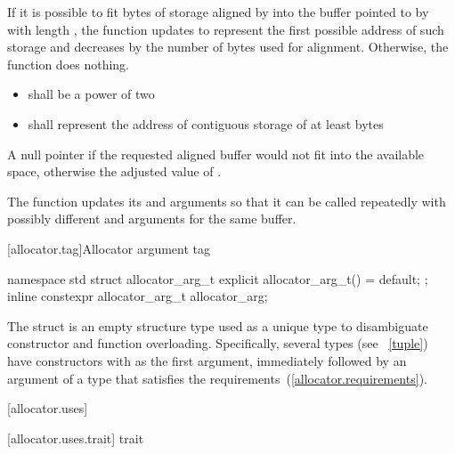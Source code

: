 \begin{itemdescr}
\pnum
\effects If it is possible to fit  bytes
of storage aligned by  into the buffer pointed to by
 with length , the function updates
 to represent the first possible address of such storage
and decreases  by the number of bytes used for alignment.
Otherwise, the function does nothing.

\pnum
\requires

\begin{itemize}
\item {} shall be a power of two

\item {} shall represent the address of contiguous storage of at least
 bytes
\end{itemize}

\pnum
\returns A null pointer if the requested aligned buffer
would not fit into the available space, otherwise the adjusted value
of .

\pnum
\begin{note} The function updates its 
and  arguments so that it can be called repeatedly
with possibly different  and 
arguments for the same buffer.  \end{note}
\end{itemdescr}

[allocator.tag]{Allocator argument tag}

%
%
\begin{itemdecl}
namespace std {
  struct allocator_arg_t { explicit allocator_arg_t() = default; };
  inline constexpr allocator_arg_t allocator_arg{};
}
\end{itemdecl}

\pnum
The  struct is an empty structure type used as a unique type to
disambiguate constructor and function overloading. Specifically, several types (see
~\ref{tuple}) have constructors with  as the first
argument, immediately followed by an argument of a type that satisfies the
 requirements~(\ref{allocator.requirements}).

[allocator.uses]{}

[allocator.uses.trait]{ trait}

